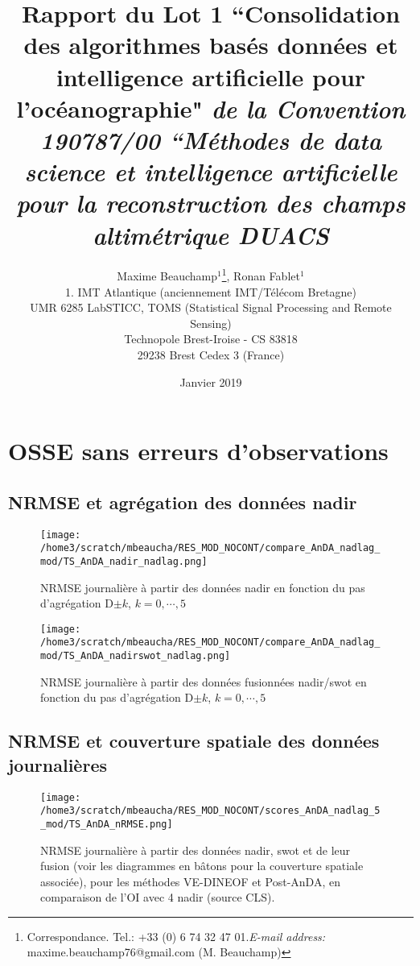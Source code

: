 \documentclass[fleqn]{report}
\title{Rapport du Lot 1 ``Consolidation des algorithmes basés données et intelligence artificielle pour l'océanographie" \newline \smaller{} \textit{de la Convention 190787/00 ``Méthodes de data science et intelligence artificielle pour la reconstruction des champs altimétrique DUACS}}
\author{Maxime Beauchamp$^{1}$\footnote{Correspondance. Tel.: +33 (0) 6 74 32 47 01.\newline\textit{E-mail address:} maxime.beauchamp76@gmail.com (M. Beauchamp)}, Ronan Fablet$^{1}$ \\ 
{\small 1. IMT Atlantique (anciennement IMT/Télécom Bretagne)} \\  	
{\small UMR 6285 LabSTICC, TOMS (Statistical Signal Processing and Remote Sensing)} \\
{\small Technopole Brest-Iroise - CS 83818} \\
{\small 29238 Brest Cedex 3 (France)} }
\date{Janvier 2019}
\begin{document}
{
\makeatletter
\addtocounter{footnote}{1} %
\renewcommand\thefootnote{\@fnsymbol\c@footnote}%
\makeatother
\maketitle
}

\maketitle

\begin{small}
\tableofcontents
\end{small}


\section{OSSE sans erreurs d'observations}

\subsection{NRMSE et agrégation des données nadir}

\begin{figure}[H]
  \centering
  \texttt{[image: /home3/scratch/mbeaucha/RES\_MOD\_NOCONT/compare\_AnDA\_nadlag\_mod/TS\_AnDA\_nadir\_nadlag.png]}
  \caption{NRMSE journalière à partir des données nadir en fonction du pas d'agrégation D$\pm k$, $k=0,\cdots,5$}
\end{figure} 

\begin{figure}[H]
  \centering
  \texttt{[image: /home3/scratch/mbeaucha/RES\_MOD\_NOCONT/compare\_AnDA\_nadlag\_mod/TS\_AnDA\_nadirswot\_nadlag.png]}
  \caption{NRMSE journalière à partir des données fusionnées nadir/swot en fonction du pas d'agrégation D$\pm k$, $k=0,\cdots,5$}
\end{figure} 

\subsection{NRMSE et couverture spatiale des données journalières}

\begin{figure}[H]
  \centering
  \texttt{[image: /home3/scratch/mbeaucha/RES\_MOD\_NOCONT/scores\_AnDA\_nadlag\_5\_mod/TS\_AnDA\_nRMSE.png]}
  \caption{NRMSE journalière à partir des données nadir, swot et de leur fusion (voir les diagrammes en bâtons pour la couverture spatiale associée), pour les méthodes VE-DINEOF et Post-AnDA, en comparaison de l'OI avec 4 nadir (source CLS).}
\end{figure} 
\end{document}
